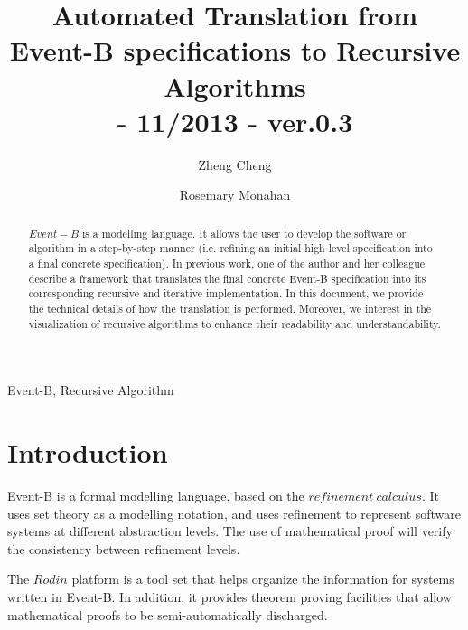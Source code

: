 \documentclass{easychair}
\newenvironment{keywords}{
       \list{}{\advance\topsep by0.35cm\relax\small
       \leftmargin=1cm
       \labelwidth=0.35cm
       \listparindent=0.35cm
       \itemindent\listparindent
       \rightmargin\leftmargin}\item[\hskip\labelsep
                                     \bfseries Keywords:]}
     {\endlist}
\begin{document}
\pagestyle{plain}

\title{Automated Translation from Event-B specifications to Recursive Algorithms
\\\small{- 11/2013 - ver.0.3} 
}
\author{
Zheng Cheng \and
Rosemary Monahan 
}


\maketitle  

\begin{abstract}
$Event-B$ is a modelling language. It allows the user to develop the software or algorithm in a step-by-step manner (i.e. refining an initial high level specification into a final concrete specification). In previous work, one of the author and her colleague describe a framework that translates the final concrete Event-B specification into its corresponding recursive and iterative implementation. In this document, we provide the technical details of how the translation is performed. Moreover, we interest in the visualization of recursive algorithms to enhance their readability and understandability.
 
\end{abstract}   

\begin{keywords}
 Event-B,
 Recursive Algorithm
\end{keywords}

\section{Introduction} %
Event-B is a formal modelling language, based on the $refinement\ calculus$. It uses set theory as a modelling notation, and uses refinement to represent software systems at different abstraction levels. The use of mathematical proof will verify the consistency between refinement levels.

The $Rodin$ platform is a tool set that helps organize the information for systems written in Event-B. In addition, it provides theorem proving facilities that allow mathematical proofs to be semi-automatically discharged.
\end{document}
